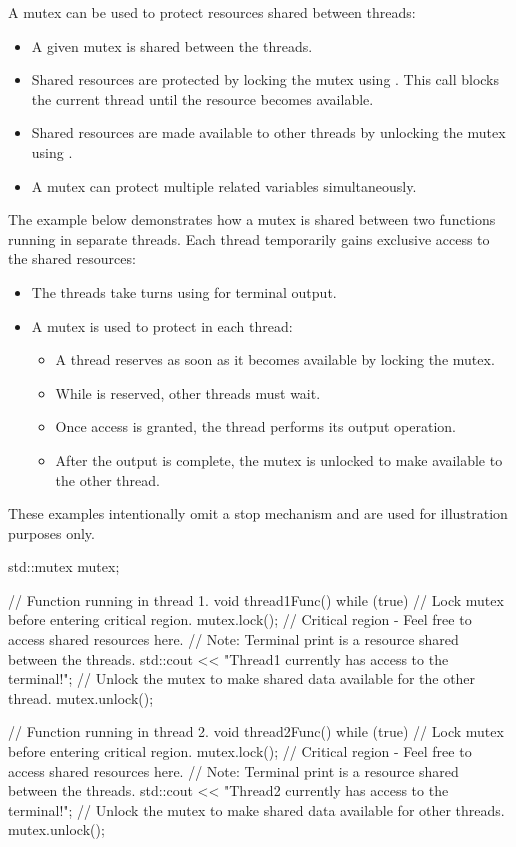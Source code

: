\noindent A mutex can be used to protect resources shared between threads:
\begin{itemize}
  \item A given mutex is shared between the threads.
  \item Shared resources are protected by locking the mutex using . This call blocks
    the current thread until the resource becomes available.
  \item Shared resources are made available to other threads by unlocking the mutex using
    .
  \item A mutex can protect multiple related variables simultaneously.
\end{itemize}
The example below demonstrates how a mutex is shared between two functions running in separate
threads. Each thread temporarily gains exclusive access to the shared resources:
\begin{itemize}
  \item The threads take turns using  for terminal output.
  \item A mutex is used to protect  in each thread:
  \begin{itemize}
    \item A thread reserves  as soon as it becomes available by locking the mutex.
    \item While  is reserved, other threads must wait.
    \item Once access is granted, the thread performs its output operation.
    \item After the output is complete, the mutex is unlocked to make  available to
      the other thread.
  \end{itemize}
\end{itemize}
\note These examples intentionally omit a stop mechanism and are used for illustration purposes
only.

\begin{cppcode}
std::mutex mutex{};

// Function running in thread 1.
void thread1Func()
{
    while (true)
    {
        // Lock mutex before entering critical region.
        mutex.lock();
        {
            // Critical region - Feel free to access shared resources here.
            // Note: Terminal print is a resource shared between the threads.
            std::cout << "Thread1 currently has access to the terminal!\n";
        }
        // Unlock the mutex to make shared data available for the other thread.
        mutex.unlock();
    }
}

// Function running in thread 2.
void thread2Func()
{
    while (true)
    {
        // Lock mutex before entering critical region.
        mutex.lock();
        {
            // Critical region - Feel free to access shared resources here.
            // Note: Terminal print is a resource shared between the threads.
            std::cout << "Thread2 currently has access to the terminal!\n";
        }
        // Unlock the mutex to make shared data available for other threads.
        mutex.unlock();
    }
}
\end{cppcode}

